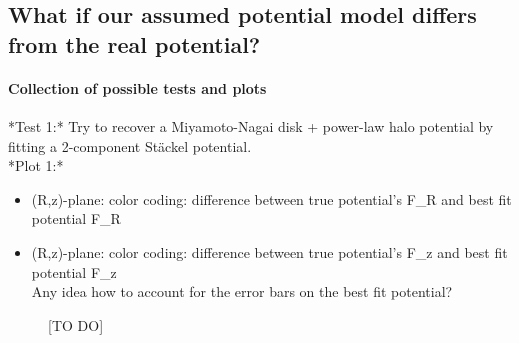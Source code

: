 \subsection{What if our assumed potential model differs from the real potential?}

\paragraph{Collection of possible tests and plots}

*Test 1:* Try to recover a Miyamoto-Nagai disk + power-law halo potential by fitting a 2-component St\"ackel potential. \\
*Plot 1:* 
\begin{itemize}
   \item (R,z)-plane: color coding: difference between true potential's F\_R and best fit potential F\_R
    \item (R,z)-plane: color coding: difference between true potential's F\_z and best fit potential F\_z \\
    Any idea how to account for the error bars on the best fit potential?
\end{itemize}


\begin{figure}
\caption{[TO DO]}
\end{figure}





